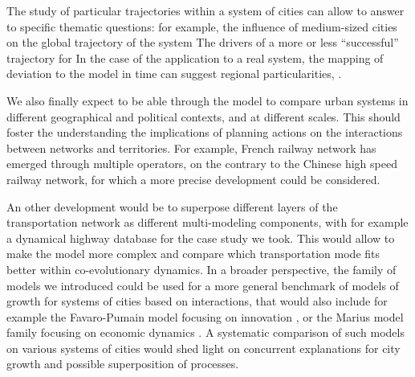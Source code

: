 The study of particular trajectories within a system of cities can allow to answer to specific thematic questions: for example, the influence of medium-sized cities on the global trajectory of the system  The drivers of a more or less ``successful'' trajectory for  In the case of the application to a real system, the mapping of deviation to the model in time can suggest regional particularities, .


We also finally expect to be able through the model to compare urban systems in different geographical and political contexts, and at different scales. This should foster the understanding the implications of planning actions on the interactions between networks and territories. For example, French railway network has emerged through multiple operators, on the contrary to the Chinese high speed railway network, for which a more precise development could be considered.


An other development would be to superpose different layers of the transportation network as different multi-modeling components, with for example a dynamical highway database for the case study we took. This would allow to make the model more complex and compare which transportation mode fits better within co-evolutionary dynamics. In a broader perspective, the family of models we introduced could be used for a more general benchmark of models of growth for systems of cities based on interactions, that would also include for example the Favaro-Pumain model focusing on innovation \citep{favaro2011gibrat}, or the Marius model family focusing on economic dynamics \citep{cottineau2014evolution}. A systematic comparison of such models on various systems of cities would shed light on concurrent explanations for city growth and possible superposition of processes.


